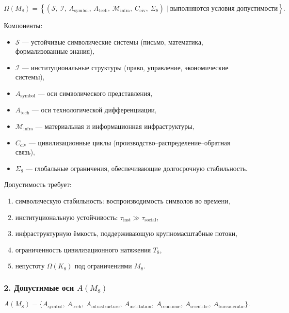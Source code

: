 \[
\Omega(M_8)=
\left\{
(
\mathcal{S},\
\mathcal{I},\
A_{\mathrm{symbol}},\
A_{\mathrm{tech}},\
\mathcal{M}_{\mathrm{infra}},\
C_{\mathrm{civ}},\
\Sigma_8
)
\mid \text{выполняются условия допустимости}
\right\}.
\]

Компоненты:

\begin{itemize}
    \item $\mathcal{S}$ — устойчивые символические системы (письмо, математика, формализованные знания),
    \item $\mathcal{I}$ — институциональные структуры (право, управление, экономические системы),
    \item $A_{\mathrm{symbol}}$ — оси символического представления,
    \item $A_{\mathrm{tech}}$ — оси технологической дифференциации,
    \item $\mathcal{M}_{\mathrm{infra}}$ — материальная и информационная инфраструктуры,
    \item $C_{\mathrm{civ}}$ — цивилизационные циклы (производство–распределение–обратная связь),
    \item $\Sigma_8$ — глобальные ограничения, обеспечивающие долгосрочную стабильность.
\end{itemize}

Допустимость требует:

\begin{enumerate}
    \item символическую стабильность: воспроизводимость символов во времени,
    \item институциональную устойчивость: $\tau_{\mathrm{inst}} \gg \tau_{\mathrm{social}}$,
    \item инфраструктурную ёмкость, поддерживающую крупномасштабные потоки,
    \item ограниченность цивилизационного натяжения $T_8$,
    \item непустоту $\Omega(K_8)$ под ограничениями $M_8$.
\end{enumerate}

\subsubsection*{2. Допустимые оси \texorpdfstring{$A(M_8)$}{A(M_8)}}

\[
A(M_8)=
\{
A_{\mathrm{symbol}},\
A_{\mathrm{tech}},\
A_{\mathrm{infrastructure}},\
A_{\mathrm{institution}},\
A_{\mathrm{economic}},\
A_{\mathrm{scientific}},\
A_{\mathrm{bureaucratic}}
\}.
\]

